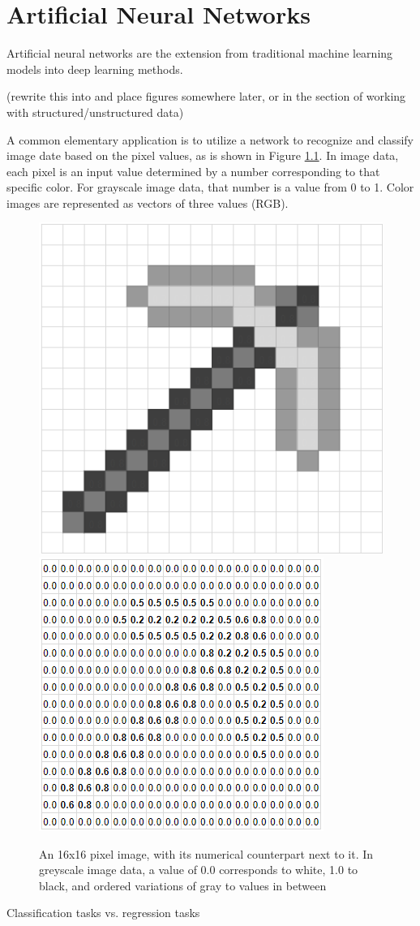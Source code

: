 \chapter{Artificial Neural Networks}



Artificial neural networks are the extension from traditional machine learning models into deep learning methods.

(rewrite this into and place figures somewhere later, or in the section of working with structured/unstructured data)

A common elementary application is to utilize a network to recognize and classify image date based on the pixel values, as is shown in Figure \ref{minecraft}.  In image data, each pixel is an input value determined by a number corresponding to that specific color.  For grayscale image data, that number is a value from 0 to 1.  Color images are represented as vectors of three values (RGB).

\begin{figure}[H]
    \centering
    \includegraphics[width=.35\textwidth]{Figures/pickaxe_1.png}
    \hspace{30pt}
    \includegraphics[width=.35\textwidth]{Figures/pickaxe_2.png}
    \caption{\footnotesize{An 16x16 pixel image, with its numerical counterpart next to it.  In greyscale image data, a value of 0.0 corresponds to white, 1.0 to black, and ordered variations of gray to values in between}}
    \label{minecraft}
\end{figure}

Classification tasks vs. regression tasks

